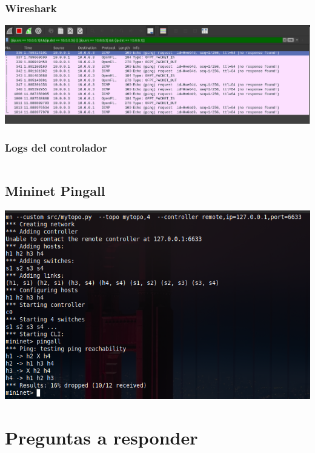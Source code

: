 \documentclass{article}
\begin{document}
\subsubsection{Wireshark}
\begin{center}
\includegraphics[scale=0.35]{Banned_Tuple_WS.png}
\end{center}


\subsubsection{Logs del controlador}
\begin{center}
  \inputminted[fontsize=\footnotesize]{text}{informe/logs/Banned_Tuple_Log.txt}
\end{center}


\subsection{Mininet Pingall}
\begin{center}
  \includegraphics[scale=0.35]{Mininet_Banned_Tupled.png}
\end{center}

\section{Preguntas a responder}\label{preguntas-a-responder}
\end{document}
